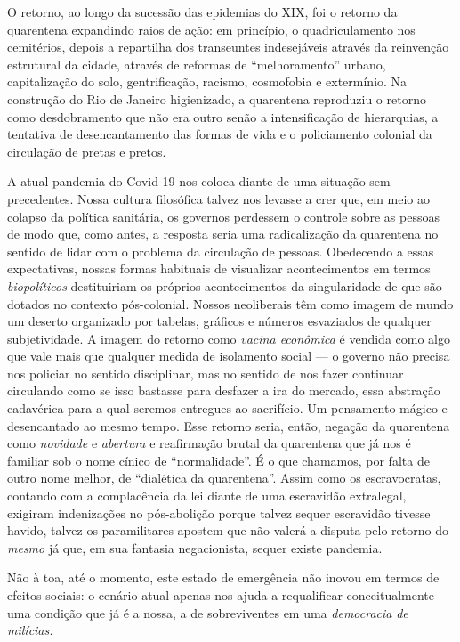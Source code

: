 O retorno, ao longo da sucessão das epidemias do XIX, foi o retorno da
quarentena expandindo raios de ação: em princípio, o quadriculamento nos
cemitérios, depois a repartilha dos transeuntes indesejáveis através da
reinvenção estrutural da cidade, através de reformas de ``melhoramento''
urbano, capitalização do solo, gentrificação, racismo, cosmofobia e
extermínio. Na construção do Rio de Janeiro higienizado, a quarentena
reproduziu o retorno como desdobramento que não era outro senão a
intensificação de hierarquias, a tentativa de desencantamento das formas
de vida e o policiamento colonial da circulação de pretas e pretos.

A atual pandemia do Covid-19 nos coloca diante de uma situação sem
precedentes. Nossa cultura filosófica talvez nos levasse a crer que, em
meio ao colapso da política sanitária, os governos perdessem o controle
sobre as pessoas de modo que, como antes, a resposta seria uma
radicalização da quarentena no sentido de lidar com o problema da
circulação de pessoas. Obedecendo a essas expectativas, nossas formas
habituais de visualizar acontecimentos em termos \emph{biopolíticos}
destituiriam os próprios acontecimentos da singularidade de que são
dotados no contexto pós-colonial. Nossos neoliberais têm como imagem de
mundo um deserto organizado por tabelas, gráficos e números esvaziados
de qualquer subjetividade. A imagem do retorno como \emph{vacina
econômica} é vendida como algo que vale mais que qualquer medida de
isolamento social --- o governo não precisa nos policiar no sentido
disciplinar, mas no sentido de nos fazer continuar circulando como se
isso bastasse para desfazer a ira do mercado, essa abstração cadavérica
para a qual seremos entregues ao sacrifício. Um pensamento mágico e
desencantado ao mesmo tempo. Esse retorno seria, então, negação da
quarentena como \emph{novidade} e \emph{abertura} e reafirmação brutal
da quarentena que já nos é familiar sob o nome cínico de
``normalidade''. É o que chamamos, por falta de outro nome melhor, de
``dialética da quarentena''. Assim como os escravocratas, contando com a
complacência da lei diante de uma escravidão extralegal, exigiram
indenizações no pós-abolição porque talvez sequer escravidão tivesse
havido, talvez os paramilitares apostem que não valerá a disputa pelo
retorno do \emph{mesmo} já que, em sua fantasia negacionista, sequer
existe pandemia.

Não à toa, até o momento, este estado de emergência não inovou em termos
de efeitos sociais: o cenário atual apenas nos ajuda a requalificar
conceitualmente uma condição que já é a nossa, a de sobreviventes em uma
\emph{democracia} \emph{de milícias:}

